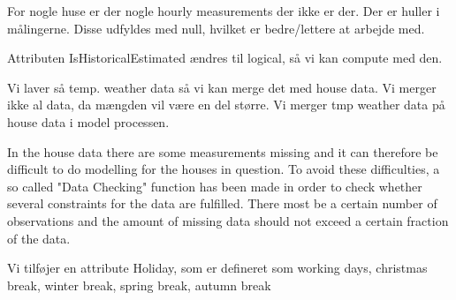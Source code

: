 For nogle huse er der nogle hourly measurements der ikke er der. Der er huller i målingerne. Disse udfyldes med null, hvilket er bedre/lettere at arbejde med. 


Attributen IsHistoricalEstimated ændres til logical, så vi kan compute med den. 

Vi laver så temp. weather data så vi kan merge det med house data. 
Vi merger ikke al data, da mængden vil være en del større. Vi merger tmp weather data på house data i model processen. 

In the house data there are some measurements missing and it can therefore be difficult to do modelling for the houses in question. To avoid these difficulties, a so called "Data Checking" function has been made in order to check whether several constraints for the data are fulfilled. There most be a certain number of observations and the amount of missing data should not exceed a certain fraction of the data. 


Vi tilføjer en attribute Holiday, som er defineret som working days, christmas break, winter break, spring break, autumn break  